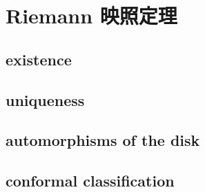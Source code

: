 \section{Riemann 映照定理}
\label{b3:sec:0503}


\subsection{existence}
\label{b3:subsec:050301}

\subsection{uniqueness}
\label{b3:subsec:050302}

\subsection{automorphisms of the disk}
\label{b3:subsec:050303}

\subsection{conformal classification}
\label{b3:subsec:050304}


